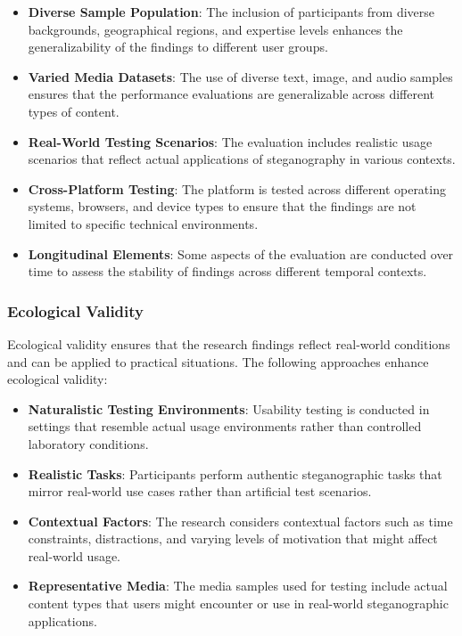\documentclass[12pt, a4paper, oneside]{book}
\begin{document}
\begin{itemize}[leftmargin=*]
    \item \textbf{Diverse Sample Population}: The inclusion of participants from diverse backgrounds, geographical regions, and expertise levels enhances the generalizability of the findings to different user groups.

    \item \textbf{Varied Media Datasets}: The use of diverse text, image, and audio samples ensures that the performance evaluations are generalizable across different types of content.

    \item \textbf{Real-World Testing Scenarios}: The evaluation includes realistic usage scenarios that reflect actual applications of steganography in various contexts.

    \item \textbf{Cross-Platform Testing}: The platform is tested across different operating systems, browsers, and device types to ensure that the findings are not limited to specific technical environments.

    \item \textbf{Longitudinal Elements}: Some aspects of the evaluation are conducted over time to assess the stability of findings across different temporal contexts.
\end{itemize}

\subsubsection{Ecological Validity}
Ecological validity ensures that the research findings reflect real-world conditions and can be applied to practical situations. The following approaches enhance ecological validity:

\begin{itemize}[leftmargin=*]
    \item \textbf{Naturalistic Testing Environments}: Usability testing is conducted in settings that resemble actual usage environments rather than controlled laboratory conditions.

    \item \textbf{Realistic Tasks}: Participants perform authentic steganographic tasks that mirror real-world use cases rather than artificial test scenarios.

    \item \textbf{Contextual Factors}: The research considers contextual factors such as time constraints, distractions, and varying levels of motivation that might affect real-world usage.

    \item \textbf{Representative Media}: The media samples used for testing include actual content types that users might encounter or use in real-world steganographic applications.
\end{itemize}
\end{document}
